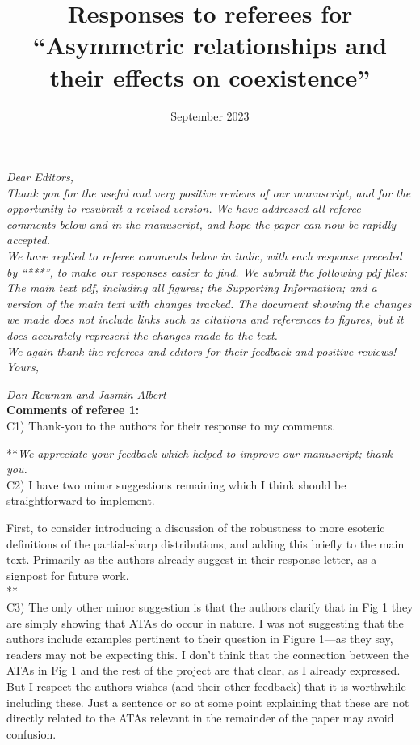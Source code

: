 \documentclass[letterpaper,11pt]{article}
\title{Responses to referees for ``Asymmetric relationships and their effects on coexistence''}
\date{September 2023}
\begin{document}
\noindent \emph{Dear Editors,} \\

\noindent \emph{Thank you for the useful and very positive reviews of our manuscript, and for
the opportunity to resubmit a revised version. We have addressed all referee comments below and in
the manuscript, and hope the paper can now be rapidly accepted. } \\

\noindent \emph{We have replied to referee comments below in italic, with each response preceded
by ``***'', to make our responses easier to find. We submit the following pdf files: The main text pdf, including all figures; 
the Supporting Information; and a version of the main text with changes tracked. The document showing 
the changes we made does not include links such as citations and
references to figures, but it does accurately represent the changes made to the text.} \\

\noindent \emph{We again thank the referees and editors for their feedback and positive reviews!} \\

\noindent \emph{Yours,}

\noindent \emph{Dan Reuman and Jasmin Albert} \\

\noindent \textbf{Comments of referee 1:} \\

\noindent C1) Thank-you to the authors for their response to my comments.

\noindent ***\emph{We appreciate your feedback which helped to improve our manuscript; thank you.} \\

\noindent C2) I have two minor suggestions remaining which I think should be straightforward to implement.

First, to consider introducing a discussion of the robustness to more esoteric definitions of the partial-sharp distributions, and adding this briefly to the main text.  Primarily as the authors already suggest in their response letter, as a signpost for future work.\\

\noindent ***\emph{} \\

\noindent C3) The only other minor suggestion is that the authors clarify that in Fig 1 they are simply showing that ATAs do occur in nature.  I was not suggesting that the authors include examples pertinent to their question in Figure 1---as they say, readers may not be expecting this. I don't think that the connection between the ATAs in Fig 1 and the rest of the project are that clear, as I already expressed. But I respect the authors wishes (and their other feedback) that it is worthwhile including these. Just a sentence or so at some point explaining that these are not directly related to the ATAs relevant in the remainder of the paper may avoid confusion. \\
\end{document}
